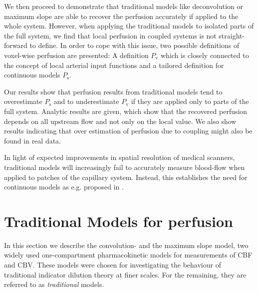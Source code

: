 \documentclass[journal,twocolumn]{IEEEtran}
\newcommand{\Perfv}{P_{\mathrm{v}}}
\newcommand{\Perfs}{P_{\mathrm{s}}}
\begin{document}
	We then proceed to demonstrate that traditional models like deconvolution or maximum slope are able to recover the perfusion accurately if applied to the whole system.
	However, when applying the traditional models to isolated parts of the full system, we find that local perfusion in coupled systems is not straight-forward to define.
	In order to cope with this issue, two possible definitions of voxel-wise perfusion are presented: A definition $\Perfv$ which is closely connected to the concept of local arterial input functions and a tailored definition for continuous models $\Perfs$.
	
	Our results show that perfusion results from traditional models tend to overestimate $\Perfs$ and to underestimate $\Perfv$ if they are applied only to parts of the full system.
	Analytic results are given, which show that the recovered perfusion depends on all upstream flow and not only on the local value.
	We also show results indicating that over estimation of perfusion due to coupling might also be found in real data.
	
In light of expected improvements in spatial resolution of medical scanners, traditional models will increasingly fail to accurately measure blood-flow when applied to patches of the capillary system. Instead, this establishes the need for continuous models as e.g. proposed in \cite{sourbron14}.
	
	
	\section{Traditional Models for perfusion} \label{sec:traditional}

	In this section we describe  the convolution- and the maximum slope model, two widely used one-compartment pharmacokinetic models for measurements of CBF and CBV. These models were chosen for investigating the behaviour of traditional indicator dilution theory at finer scales. For the remaining, they are referred to as \emph{traditional} models.
	
\end{document}
